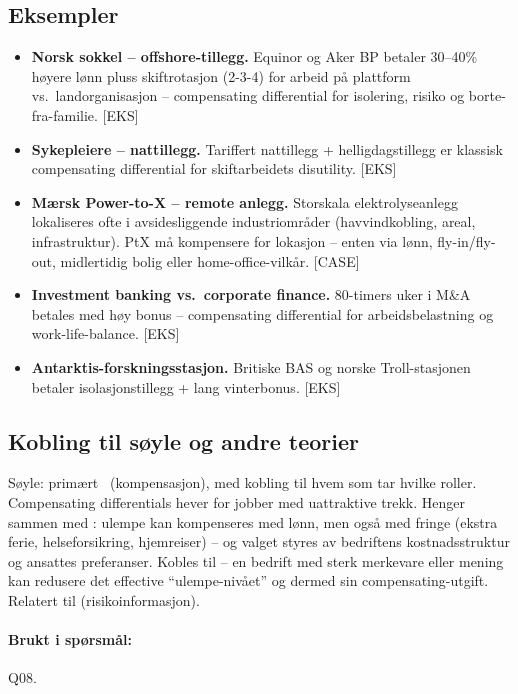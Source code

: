 \subsection*{Eksempler}
\begin{itemize}
\item \textbf{Norsk sokkel -- offshore-tillegg.} Equinor og Aker BP betaler 30--40\% høyere lønn pluss skiftrotasjon (2-3-4) for arbeid på plattform vs.\ landorganisasjon -- compensating differential for isolering, risiko og borte-fra-familie. [EKS]
\item \textbf{Sykepleiere -- nattillegg.} Tariffert nattillegg + helligdagstillegg er klassisk compensating differential for skiftarbeidets disutility. [EKS]
\item \textbf{Mærsk Power-to-X -- remote anlegg.} Storskala elektrolyseanlegg lokaliseres ofte i avsidesliggende industriområder (havvindkobling, areal, infrastruktur). PtX må kompensere for lokasjon -- enten via lønn, fly-in/fly-out, midlertidig bolig eller home-office-vilkår. [CASE]
\item \textbf{Investment banking vs.\ corporate finance.} 80-timers uker i M\&A betales med høy bonus -- compensating differential for arbeidsbelastning og work-life-balance. [EKS]
\item \textbf{Antarktis-forskningsstasjon.} Britiske BAS og norske Troll-stasjonen betaler isolasjonstillegg + lang vinterbonus. [EKS]
\end{itemize}

\subsection*{Kobling til søyle og andre teorier}
Søyle: primært \SThree\ (kompensasjon), med kobling til hvem som tar hvilke roller. Compensating differentials hever  for jobber med uattraktive trekk. Henger sammen med : ulempe kan kompenseres med lønn, men også med fringe (ekstra ferie, helseforsikring, hjemreiser) -- og valget styres av bedriftens kostnadsstruktur og ansattes preferanser. Kobles til  -- en bedrift med sterk merkevare eller mening kan redusere det effective ``ulempe-nivået'' og dermed sin compensating-utgift. Relatert til  (risikoinformasjon).

\paragraph{Brukt i spørsmål:} Q08.
